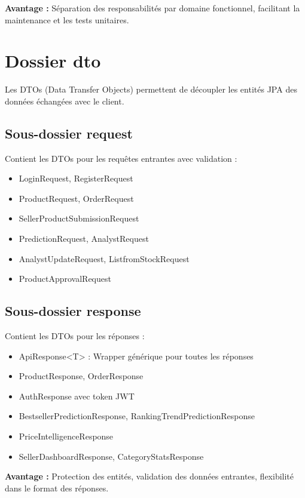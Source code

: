 \documentclass[12pt,a4paper]{report}
\begin{document}
\textbf{Avantage :} Séparation des responsabilités par domaine fonctionnel, facilitant la maintenance et les tests unitaires.

\section{Dossier dto}

Les DTOs (Data Transfer Objects) permettent de découpler les entités JPA des données échangées avec le client.

\subsection{Sous-dossier request}

Contient les DTOs pour les requêtes entrantes avec validation :
\begin{itemize}[noitemsep]
    \item LoginRequest, RegisterRequest
    \item ProductRequest, OrderRequest
    \item SellerProductSubmissionRequest
    \item PredictionRequest, AnalystRequest
    \item AnalystUpdateRequest, ListfromStockRequest
    \item ProductApprovalRequest
\end{itemize}

\subsection{Sous-dossier response}

Contient les DTOs pour les réponses :
\begin{itemize}[noitemsep]
    \item ApiResponse<T> : Wrapper générique pour toutes les réponses
    \item ProductResponse, OrderResponse
    \item AuthResponse avec token JWT
    \item BestsellerPredictionResponse, RankingTrendPredictionResponse
    \item PriceIntelligenceResponse
    \item SellerDashboardResponse, CategoryStatsResponse
\end{itemize}

\textbf{Avantage :} Protection des entités, validation des données entrantes, flexibilité dans le format des réponses.
\end{document}
